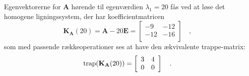 \begin{example}
Egenvektorerne for $\mathbf{A}$ hørende til egenværdien $\lambda_{1} = 20$ fås ved at løse det homogene ligningssystem, der har koefficientmatricen
\begin{equation}
\mathbf{K}_{\mathbf{A}}(20) = \mathbf{A} - 20\mathbf{E} = \left[
                                                            \begin{array}{cc}
                                                              -9 & -12 \\
                                                              -12 & -16 \\
                                                            \end{array}
                                                          \right]
 \quad ,
\end{equation}
som med passende rækkeoperationer ses at have den ækvivalente trappe-matrix:
\begin{equation}
\mathrm{trap}(\mathbf{K}_{\mathbf{A}}(20)) = \left[
                                       \begin{array}{cc}
                                         3 & 4 \\
                                         0 & 0 \\
                                       \end{array}
                                     \right]
\quad .
\end{equation}


\end{example}
